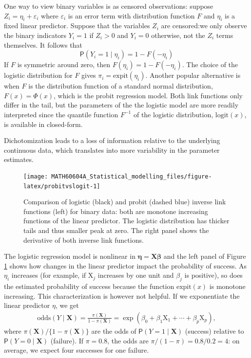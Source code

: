 \documentclass[
  11pt,
  letterpaper,
]{book}
\theoremstyle{definition}
\theoremstyle{definition}
\theoremstyle{definition}
\theoremstyle{definition}
\theoremstyle{remark}
\begin{document}
One way to view binary variables is as censored observations: suppose
\(Z_i = \eta_i + \varepsilon_i\) where \(\varepsilon_i\) is an error term
with distribution function \(F\) and \(\eta_i\) is a fixed linear predictor.
Suppose that the variables \(Z_i\) are censored:we only observe the binary
indicators \(Y_i = 1\) if \(Z_i > 0\) and \(Y_i=0\) otherwise, not the \(Z_i\)
terms themselves. It follows that \[
\mathsf{P}(Y_i = 1 \mid \eta_i) = 1-F(-\eta_i)
\] If \(F\) is symmetric around zero, then \(F(\eta_i) = 1-F(-\eta_i)\). The
choice of the logistic distribution for \(F\) gives
\(\pi_i = \mathrm{expit}(\eta_i)\). Another popular alternative is when
\(F\) is the distribution function of a standard normal distribution,
\(F(x) = \Phi(x)\), which is the probit regression model. Both link
functions only differ in the tail, but the parameters of the the
logistic model are more readily interpreted since the quantile function
\(F^{-1}\) of the logistic distribution, \(\mathrm{logit}(x)\), is available
in closed-form.

Dichotomization leads to a loss of information relative to the
underlying continuous data, which translates into more variability in
the parameter estimates.

\begin{figure}

{\centering \texttt{[image: MATH60604A\_Statistical\_modelling\_files/figure-latex/probitvslogit-1]} 

}

\caption{Comparison of logistic (black) and probit (dashed blue) inverse link functions (left) for binary data: both are monotone increasing functions of the linear predictor. The logistic distribution has thicker tails and thus smaller peak at zero. The right panel shows the derivative of both inverse link functions.}\label{fig:probitvslogit}
\end{figure}

The logistic regression model is nonlinear in
\(\boldsymbol{\eta}=\mathbf{X}\boldsymbol{\beta}\) and the left panel of
Figure \ref{fig:probitvslogit} shows how changes in the linear
predictor impact the probability of success. As \(\eta_i\) increases (for
example, if \(\mathrm{X}_j\) increases by one unit and \(\beta_j\) is
positive), so does the estimated probability of success because the
function \(\mathrm{expit}(x)\) is monotone increasing. This
characterization is however not helpful. If we exponentiate the linear
predictor \(\eta\), we get
\begin{align*}
\mathrm{odds}(Y\mid \mathbf{X}) =
\frac{\pi(\mathbf{X})}{1-\pi(\mathbf{X})}=\exp(\beta_0+ \beta_1
\mathrm{X}_1 + \cdots + \beta_p\mathrm{X}_p),
\end{align*}
where \(\pi(\mathbf{X})/\{1-\pi(\mathbf{X})\}\) are the odds of \(\mathsf{P}(Y=1 \mid \mathbf{X})\) (success) relative to \(\mathsf{P}(Y=0 \mid\mathbf{X})\) (failure). If \(\pi=0.8\), the odds are \(\pi/(1-\pi)=0.8/0.2=4\): on average, we expect four successes for one failure.
\end{document}
